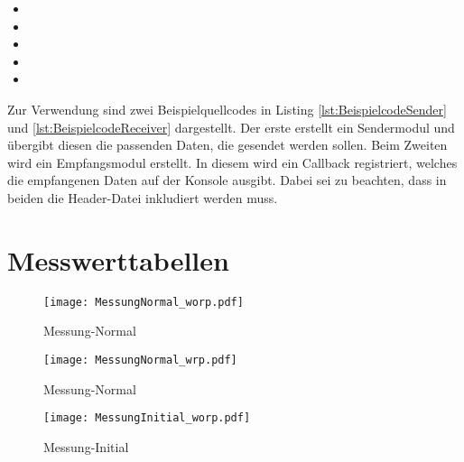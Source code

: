 \begin{itemize}
\item {} 
\item {}
\item {}
\item {}
\item {}
\end{itemize}

Zur Verwendung sind zwei Beispielquellcodes in Listing
\ref{lst:BeispielcodeSender} und \ref{lst:BeispielcodeReceiver} dargestellt. Der
erste erstellt ein Sendermodul und {\"u}bergibt diesen die passenden Daten, die
gesendet werden sollen. Beim Zweiten wird ein Empfangsmodul erstellt. In diesem
wird ein Callback registriert, welches die empfangenen Daten auf der Konsole
ausgibt. Dabei sei zu beachten, dass in beiden die Header-Datei 
inkludiert werden muss.

\newpage

\lstset{language=C++}



\lstset{language=C++}


\section{Messwerttabellen}

\label{sec:messtabellen}

\begin{figure}[H]
	\texttt{[image: MessungNormal\_worp.pdf]}
	\caption{Messung-Normal}	
\end{figure}

\newpage

\begin{figure}[H]
	\texttt{[image: MessungNormal\_wrp.pdf]}
	\caption{Messung-Normal}	
\end{figure}

\newpage

\begin{figure}[H]
	\texttt{[image: MessungInitial\_worp.pdf]}
	\caption{Messung-Initial}	
\end{figure}

